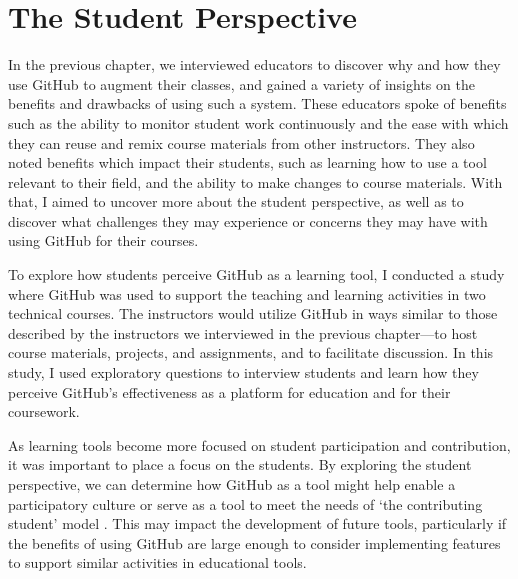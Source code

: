 








\chapter{The Student Perspective}

In the previous chapter, we interviewed educators to discover why and how they use GitHub to augment their classes, and gained a variety of insights on the benefits and drawbacks of using such a system. These educators spoke of benefits such as the ability to monitor student work continuously and the ease with which they can reuse and remix course materials from other instructors. They also noted benefits which impact their students, such as learning how to use a tool relevant to their field, and the ability to make changes to course materials. With that, I aimed to uncover more about the student perspective, as well as to discover what challenges they may experience or concerns they may have with using GitHub for their courses. %

To explore how students perceive GitHub as a learning tool, I conducted a study where GitHub was used to support the teaching and learning activities in two technical courses. The instructors would utilize GitHub in ways similar to those described by the instructors we interviewed in the previous chapter---to host course materials, projects, and assignments, and to facilitate discussion. In this study, I used exploratory questions to interview students and learn how they perceive GitHub's effectiveness as a platform for education and for their coursework.

As learning tools become more focused on student participation and contribution, it was important to place a focus on the students. By exploring the student perspective, we can determine how GitHub as a tool might help enable a participatory culture \cite{jenkins2009confronting} or serve as a tool to meet the needs of `the contributing student' model \cite{hamer2008contributing}. This may impact the development of future tools, particularly if the benefits of using GitHub are large enough to consider implementing features to support similar activities in educational tools.

